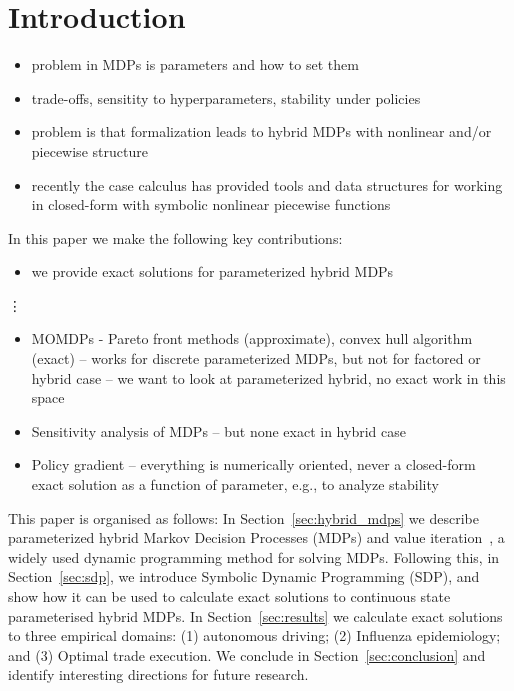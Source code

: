 \section{Introduction}
\label{sec:introduction}

\begin{itemize}
    \item problem in MDPs is parameters and how to set them
    \item trade-offs, sensitity to hyperparameters, stability under policies
    \item problem is that formalization leads to hybrid MDPs with nonlinear and/or piecewise structure
    \item recently the case calculus has provided tools and data structures for working in closed-form with symbolic nonlinear piecewise functions
\end{itemize}

In this paper we make the following key contributions:
\begin{itemize}
    \item we provide exact solutions for parameterized hybrid MDPs
\end{itemize}

\vdots

\begin{itemize}
    \item MOMDPs - Pareto front methods (approximate), convex hull algorithm (exact) -- works for discrete parameterized MDPs, but not for factored or hybrid case -- we want to look at parameterized hybrid, no exact work in this space
    \item Sensitivity analysis of MDPs -- but none exact in hybrid case
    \item Policy gradient -- everything is numerically oriented, never a closed-form exact solution as a function of parameter, e.g., to analyze stability
\end{itemize}

This paper is organised as follows: In Section~\ref{sec:hybrid_mdps} we describe parameterized hybrid Markov Decision Processes (MDPs) and value iteration~\parencite{Bellman_PU_1957}, a widely used dynamic programming method for solving MDPs. Following this, in Section~\ref{sec:sdp}, we introduce Symbolic Dynamic Programming (SDP), and show how it can be used to calculate exact solutions to continuous state parameterised hybrid MDPs. In Section~\ref{sec:results} we calculate exact solutions to three empirical domains: (1) autonomous driving; (2) Influenza epidemiology; and (3) Optimal trade execution. We conclude in Section~\ref{sec:conclusion} and identify interesting directions for future research.
